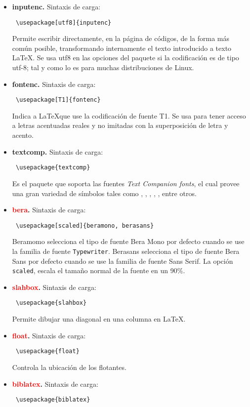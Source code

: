 \begin{itemize}
\item \textbf{inputenc.} Sintaxis de carga:  \begin{verbatim} \usepackage[utf8]{inputenc}
\end{verbatim} Permite escribir directamente, en la página de códigos, de la forma m\'{a}s común posible, transformando internamente el texto introducido a texto \LaTeX. Se usa utf8 en las opciones del paquete si la codificación es de tipo utf-8; tal y como lo es para muchas distribuciones de Linux.
\item \textbf{fontenc.} Sintaxis de carga: \begin{verbatim} \usepackage[T1]{fontenc}
\end{verbatim} Indica a \LaTeX que use la codificación de fuente T1. Se usa para tener acceso a letras acentuadas reales y no imitadas con la superposición de letra y acento.
\item \textbf{textcomp.}  Sintaxis de carga:  \begin{verbatim} \usepackage{textcomp}
\end{verbatim} Es el paquete que soporta las fuentes \textit{Text Companion fonts}, el cual provee una gran variedad de símbolos tales como \textcopyright{}, \textyen{}, \texteuro{} , \textcelsius{}, \textdegree{}, entre otros.
\item \textbf{\textcolor{red}{bera}.} Sintaxis de carga:  \begin{verbatim} \usepackage[scaled]{beramono, berasans}
\end{verbatim} Beramomo selecciona el tipo de fuente Bera Mono por defecto cuando se use la familia de fuente \texttt{Typewriter}. Berasans selecciona el tipo de fuente Bera Sans por defecto cuando se use la familia de fuente \textsf{Sans Serif}. La opción \texttt{scaled}, escala el tamaño normal de la fuente en un 90\%.
\item \textbf{\textcolor{red}{slahbox}.}  Sintaxis de carga:  \begin{verbatim} \usepackage{slahbox}
\end{verbatim} Permite dibujar una diagonal en una columna en LaTeX.
\item \textbf{\textcolor{red}{float}.}  Sintaxis de carga:  \begin{verbatim} \usepackage{float}
\end{verbatim} Controla la ubicación de los flotantes.
\item \textbf{\textcolor{red}{biblatex}.}  Sintaxis de carga:  \begin{verbatim} \usepackage{biblatex}

\end{verbatim}
\end{itemize}
